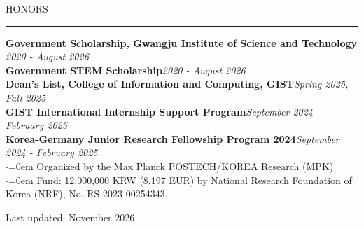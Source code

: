\documentclass{resume} %
\renewenvironment{rSection}[2][]{
\vspace{-0.5 em} %
\sectionskip
\noindent\textcolor{RoyalPurple}{\MakeUppercase{#2}}\hfill{\footnotesize #1}\par
\sectionlineskip
\hrule
\begin{list}{}{
\setlength{\leftmargin}{1.5em}
}
\item[]
}{
\end{list}
}
\begin{document}
\begin{rSection}{Honors} \itemsep -2pt
{\bf Government Scholarship, Gwangju Institute of Science and Technology }\hfill {\em 2020 - August 2026}\\
{\bf Government STEM Scholarship}\hfill {\em 2020 - August 2026} \\
{\bf Dean's List, College of Information and Computing, GIST}\hfill {\em Spring 2025, Fall 2025} \\
{\bf GIST International Internship Support Program}\hfill {\em September 2024 - February 2025} \\
{\bf Korea-Germany Junior Research Fellowship Program 2024}\hfill {\em September 2024 - February 2025} \\
{$\cdot$}{\leftmargin=0em} Organized by the Max Planck POSTECH/KOREA Research (MPK) \\
{$\cdot$}{\leftmargin=0em} Fund: 12,000,000 KRW (8,197 EUR) by National Research Foundation of Korea (NRF), No. RS-2023-00254343. \\


\end{rSection}

\vfill
\begin{center}{\footnotesize\color{gray} Last updated: November 2026}\end{center}
\end{document}

